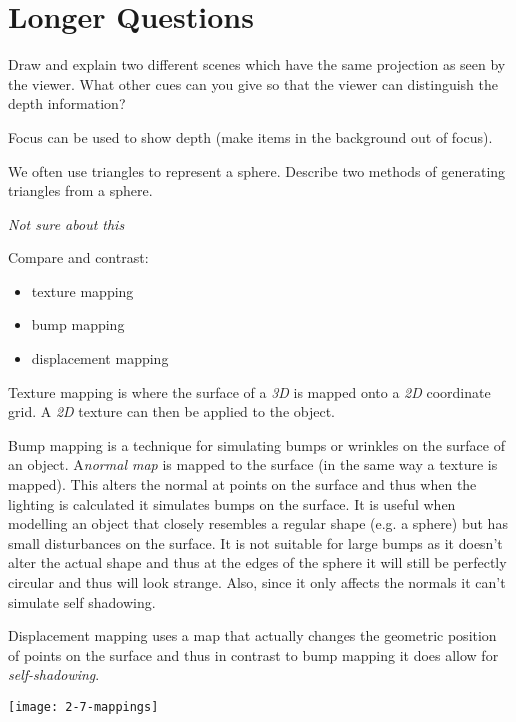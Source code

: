 \documentclass{supervision}
\begin{document}
\section*{Longer Questions}
\begin{questions}
    \question
    Draw and explain two different scenes which have the same projection as seen by the viewer. What other cues can you give so that the viewer can distinguish the depth information?
    \begin{solution}
    Focus can be used to show depth (make items in the background out of focus).
    \end{solution}

    \question
    We often use triangles to represent a sphere. Describe two methods of generating triangles from a sphere.
    \begin{solution}
    \textit{Not sure about this}
    \end{solution}
    \question
    Compare and contrast:
    \begin{itemize}
        \item{texture mapping}
        \item{bump mapping}
        \item{displacement mapping}
    \end{itemize}
    \begin{solution}
    Texture mapping is where the surface of a \textit{3D} is mapped onto a \textit{2D} coordinate grid. A \textit{2D} texture can then be applied to the object.
    
    Bump mapping is a technique for simulating bumps or wrinkles on the surface of an object. A\textit{normal map} is mapped to the surface (in the same way a texture is mapped). This alters the normal at points on the surface and thus when the lighting is calculated it simulates bumps on the surface. It is useful when modelling an object that closely resembles a regular shape (e.g. a sphere) but has small disturbances on the surface. It is not suitable for large bumps as it doesn't alter the actual shape and thus at the edges of the sphere it will still be perfectly circular and thus will look strange. Also, since it only affects the normals it can't simulate self shadowing.
    
    Displacement mapping uses a map that actually changes the geometric position of points on the surface and thus in contrast to bump mapping it does allow for \textit{self-shadowing}.
    \begin{center}
        \texttt{[image: 2-7-mappings]}
    \end{center}
    \end{solution}


\end{questions}
\end{document}
